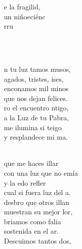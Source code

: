 \documentclass[12pt]{article}
\begin{document}
\begin{multicols*}{2}
\begin{cancion}
\begin{chorus}
	e la fragilid,\\
	un niñoeciénc\\
	    rru\\
	\end{chorus}%
	\jump\\
	    \\
\end{cancion}%

\end{multicols*}
\newpage
{}
\begin{multicols*}{2}
\begin{cancion}%
	n tu luz tamos musos,\\
	agados, tristes, ises,\\
	enconamos mil minos\\
	que nos dejan felices.\\
	ro el encuentro ntigo,\\
	a la Luz de tu Pabra,\\
	me ilumina si teigo\\
	y resplandece mi ma.\\\jump\\
	\begin{chorus}%
	 que  me haces illar \\
	con una luz que no emía\\
	y la edo refler\\
	cual si fuera luz del a. \\
	desbro que otros illan\\
	muestran su mejor lor,\\
	briamos como falia\\
	sostenida en el ar.\\
	Descuimos tantos dos,\\

\end{chorus}
\end{cancion}
\end{multicols*}
\end{document}

